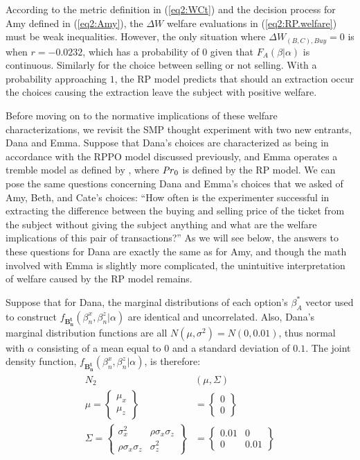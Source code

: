 \documentclass[../main.tex]{subfiles}
\begin{document}
According to the metric definition in (\ref{eq2:WCt}) and the decision process for Amy defined in (\ref{eq2:Amy}), the $\Delta W$ welfare evaluations in (\ref{eq2:RP.welfare}) must be weak inequalities.
However, the only situation where $\Delta W_{(B,C),\mathit{Buy}} = 0$ is when $r=-0.0232$, which has a probability of $0$ given that $F_A(\beta|\alpha)$ is continuous.
Similarly for the choice between selling or not selling.
With a probability approaching $1$, the RP model predicts that should an extraction occur the choices causing the extraction leave the subject with positive welfare.

Before moving on to the normative implications of these welfare characterizations, we revisit the SMP thought experiment with two new entrants, Dana and Emma.
Suppose that Dana's choices are characterized as being in accordance with the RPPO model discussed previously, and Emma operates a tremble model as defined by \textcite{Loomes2002}, where $ {\mathit{Pr}}_0$ is defined by the RP model.
We can pose the same questions concerning Dana and Emma's choices that we asked of Amy, Beth, and Cate's choices: \enquote{How often is the experimenter successful in extracting the difference between the buying and selling price of the ticket from the subject without giving the subject anything and what are the welfare implications of this pair of transactions?} 
As we will see below, the answers to these questions for Dana are exactly the same as for Amy, and though the math involved with Emma is slightly more complicated, the unintuitive interpretation of welfare caused by the RP model remains.

Suppose that for Dana, the marginal distributions of each option's $\beta_A^*$ vector used to construct $f_{\mathbf{B_n^t}}(\beta_n^ x,\beta_n^ z|\alpha)$ are identical and uncorrelated.{\footnotemark}
Also, Dana's marginal distribution functions are all $N(\mu,\sigma^2) = N(0,0.01)$, thus normal with $\alpha$ consisting of a mean equal to $0$ and a standard deviation of $0.1$.
The joint density function, $f_{\mathbf{B_n^t}}(\beta_n^x,\beta_n^z|\alpha)$, is therefore:
\begin{align}
	\begin{split}
		N_2&(\mu,\Sigma) \\
		\mu =\begin{Bmatrix}\mu_x \\ \mu_z\end{Bmatrix} &= \begin{Bmatrix}0\\0\end{Bmatrix}\\
		\Sigma =\begin{Bmatrix} \sigma_x^2 & \rho\sigma_x\sigma_z \\  \rho\sigma_x\sigma_z & \sigma_z^2 \end{Bmatrix} &= 
	\begin{Bmatrix} 0.01 & 0 \\  0 & 0.01 \end{Bmatrix} 
	\end{split}
\end{align}
\end{document}
